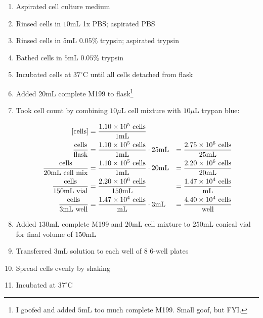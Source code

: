 \begin{enumerate}
\begin{enumerate}
			\item Aspirated cell culture medium
			\item Rinsed cells in $10$mL 1x PBS; aspirated PBS
			\item Rinsed cells in $5$mL $0.05$\% trypsin; aspirated trypsin
			\item Bathed cells in $5$mL $0.05$\% trypsin
			\item Incubated cells at $37^{\circ}$C until all cells detached from flask
			\item Added $20$mL complete M199 to flask\footnote{I goofed and added $5$mL too much complete M199. Small goof, but FYI.}
			\item Took cell count by combining $10\mu$L cell mixture with $10\mu$L trypan blue:
			
				\begin{align*}
				\text{[cells]} &= \frac{1.10\times 10^{5}\text{ cells}}{1\text{mL}} \\
				\frac{\text{cells}}{\text{flask}} &= \frac{1.10\times 10^{5}\text{ cells}}{1\text{mL}} \cdot 25\text{mL} &= \frac{2.75\times 10^{6}\text{ cells}}{25\text{mL}}\\
				\frac{\text{cells}}{20\text{mL cell mix}} &= \frac{1.10\times 10^{5}\text{ cells}}{1\text{mL}}\cdot 20\text{mL} &= \frac{2.20\times 10^{6}\text{ cells}}{20\text{mL}}\\
				\frac{\text{cells}}{150\text{mL vial}} &= \frac{2.20\times 10^{6}\text{ cells}}{150\text{mL}} &= \frac{1.47\times 10^{4}\text{ cells}}{\text{mL}}\\
				\frac{\text{cells}}{3\text{mL well}} &= \frac{1.47\times 10^{4}\text{ cells}}{\text{mL}} \cdot 3\text{mL} &= \frac{4.40\times 10^{4}\text{ cells}}{\text{well}}\\
				\end{align*}
			\item Added $130$mL complete M199 and $20$mL cell mixture to $250$mL conical vial for final volume of $150$mL
			\item Transferred $3$mL solution to each well of 8 6-well plates
			\item Spread cells evenly by shaking
			\item Incubated at $37^{\circ}$C
		\end{enumerate}
\end{enumerate}


